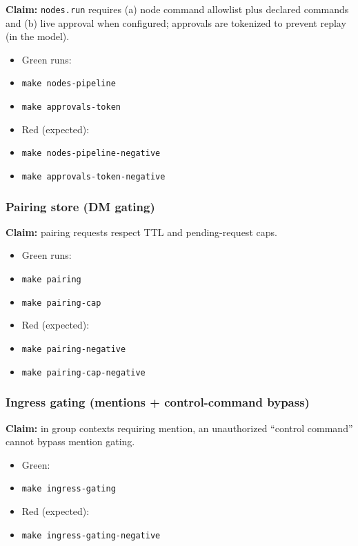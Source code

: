 \textbf{Claim:} \texttt{nodes.run} requires (a) node command allowlist plus declared commands and (b) live approval when configured; approvals are tokenized to prevent replay (in the model).

\begin{itemize}
  \item Green runs:
  \item \texttt{make nodes-pipeline}
  \item \texttt{make approvals-token}
  \item Red (expected):
  \item \texttt{make nodes-pipeline-negative}
  \item \texttt{make approvals-token-negative}
\end{itemize}


\subsubsection{Pairing store (DM gating)}


\textbf{Claim:} pairing requests respect TTL and pending-request caps.

\begin{itemize}
  \item Green runs:
  \item \texttt{make pairing}
  \item \texttt{make pairing-cap}
  \item Red (expected):
  \item \texttt{make pairing-negative}
  \item \texttt{make pairing-cap-negative}
\end{itemize}


\subsubsection{Ingress gating (mentions + control-command bypass)}


\textbf{Claim:} in group contexts requiring mention, an unauthorized “control command” cannot bypass mention gating.

\begin{itemize}
  \item Green:
  \item \texttt{make ingress-gating}
  \item Red (expected):
  \item \texttt{make ingress-gating-negative}
\end{itemize}


